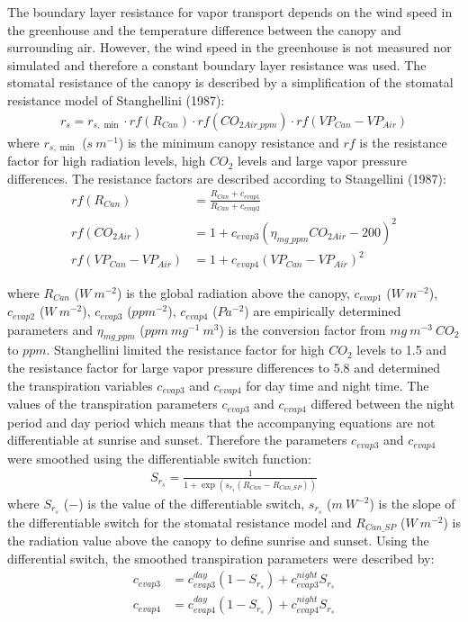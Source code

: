 \documentclass[a4paper]{article}
\numberwithin{equation}{section}
\begin{document}
The boundary layer resistance for vapor transport depends on the wind speed in the greenhouse and the temperature difference between the canopy and surrounding air\cite{stanghellini1987transpiration}.
However, the wind speed in the greenhouse is not measured nor simulated and therefore a constant boundary layer resistance was used.
The stomatal resistance of the canopy is described by a simplification of the stomatal resistance model of Stanghellini (1987):
\begin{align}
  r_s = r_{s,\min} \cdot rf(R_{Can}) \cdot rf(CO_{2Air\_ppm}) \cdot rf(VP_{Can} - VP_{Air})
\end{align}
where \( r_{s,\min} \) (\( s\ m^{-1} \)) is the minimum canopy resistance and \( rf \) is the resistance factor for high radiation levels, high \( CO_2 \) levels and large vapor pressure differences.
The resistance factors are described according to Stangellini (1987):
\begin{equation}
  \begin{split}
    rf(R_{Can}) & = \frac{R_{Can} + c_{evap1}}{R_{Can} + c_{evap2}} \\
    rf(CO_{2Air}) & = 1 + {c_{evap3} (\eta_{mg\_ppm} CO_{2Air} - 200)}^2 \\
    rf(VP_{Can} - VP_{Air}) & = 1 + {c_{evap4} (VP_{Can} - VP_{Air})}^2
  \end{split}
\end{equation}

where \( R_{Can} \) (\( W\ m^{-2} \)) is the global radiation above the canopy, \( c_{evap1} \) (\( W\ m^{-2} \)), \( c_{evap2} \) (\( W\ m^{-2} \)), \( c_{evap3} \) (\( ppm^{-2} \)), \( c_{evap4} \) (\( Pa^{-2} \)) are empirically determined parameters and \( \eta_{mg\_ppm} \) (\( ppm\ mg^{-1}\ m^3 \)) is the conversion factor from \( mg\ m^{-3}\ CO_2 \) to \( ppm \).
Stanghellini limited the resistance factor for high \( CO_2 \) levels to 1.5 and the resistance factor for large vapor pressure differences to 5.8 and determined the transpiration variables \( c_{evap3} \) and \( c_{evap4} \) for day time and night time.
The values of the transpiration parameters \( c_{evap3} \) and \( c_{evap4} \) differed between the night period and day period which means that the accompanying equations are not differentiable at sunrise and sunset. Therefore the parameters \( c_{evap3} \) and \( c_{evap4} \) were smoothed using the differentiable switch function:
\begin{align}
  S_{r_s} = \frac{1}{1 + \exp \left(s_{r_s} (R_{Can} - R_{Can\_SP})\right)}
\end{align}
where \( S_{r_s} \) (\( - \)) is the value of the differentiable switch, \( s_{r_s} \) (\( m\ W^{-2} \)) is the slope of the differentiable switch for the stomatal resistance model and \( R_{Can\_SP} \) (\( W\ m^{-2} \)) is the radiation value above the canopy to define sunrise and sunset.
Using the differential switch, the smoothed transpiration parameters were described by:
\begin{align}
  c_{evap3} & = c_{evap3}^{day} (1 - S_{r_s}) + c_{evap3}^{night} S_{r_s} \\
  c_{evap4} & = c_{evap4}^{day} (1 - S_{r_s}) + c_{evap4}^{night} S_{r_s}
\end{align}
\end{document}
